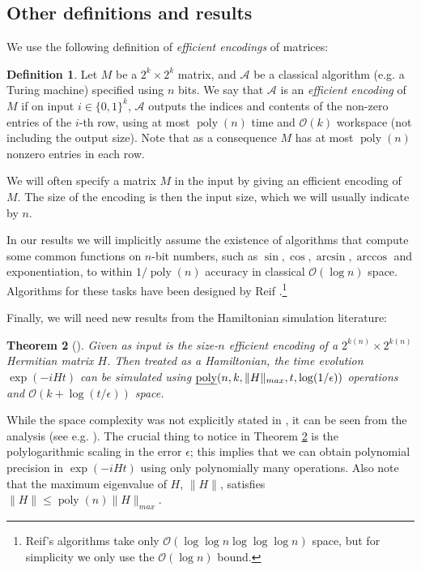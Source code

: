 \documentclass[11pt]{article}
\newtheorem{theorem}{Theorem}
\theoremstyle{definition}
\newtheorem{definition}[theorem]{Definition}
\theoremstyle{remark}
\newcommand\bigoh{\mathcal{O}}
\DeclareMathOperator{\poly}{poly}
\begin{document}
\subsection{Other definitions and results}
We use the following definition of \emph{efficient encodings} of matrices:
\begin{definition}\label{def: efficient encoding}Let $M$ be a $2^{k} \times 2^{k}$ matrix, and $\mathcal{A}$ be a classical algorithm (e.g. a Turing machine) specified using $n$ bits. We say that $\mathcal{A}$ is an \emph{efficient encoding} of $M$ if on input $i\in\{0,1\}^k$, $\mathcal{A}$ outputs the indices and contents of the non-zero entries of the $i$-th row, using at most $\poly(n)$ time and $\bigoh(k)$ workspace (not including the output size). Note that as a consequence $M$ has at most $\poly(n)$ nonzero entries in each row.
\end{definition}
We will often specify a matrix $M$ in the input by giving an efficient encoding of $M$. The size of the encoding is then the input size, which we will usually indicate by $n$.

In our results we will implicitly assume the existence of algorithms that compute some common functions on $n$-bit numbers, such as $\sin,\cos,\arcsin,\arccos$ and exponentiation, to within $1/\poly(n)$ accuracy in classical $\bigoh (\log{n})$ space.  Algorithms for these tasks have been designed by Reif \cite{reif}.\footnote{Reif's algorithms take only $\bigoh (\log\log{n}\log\log\log{n})$ space, but for simplicity we only use the $\bigoh (\log{n})$ bound.}

Finally, we will need new results from the Hamiltonian simulation literature:
\begin{theorem}[\cite{berry14,bccks15,berry15}] \label{thm:ham_sim}
Given as input is the size-$n$ efficient encoding of a $2^{k(n)} \times 2^{k(n)}$ Hermitian matrix $H$. Then treated as a Hamiltonian, the time evolution $\exp(-iHt)$ can be simulated using $\text{\emph{poly}}(n,k,\|H\|_{max}, t, \log(1/\epsilon))$ operations and $\bigoh(k+\log(t/\epsilon))$ space.
\end{theorem}
While the space complexity was not explicitly stated in \cite{berry14,bccks15,berry15}, it can be seen from the analysis (see e.g. \cite{bccks15}). The crucial thing to notice in Theorem \ref{thm:ham_sim} is the polylogarithmic scaling in the error $\epsilon$; this implies that we can obtain polynomial precision in $\exp(-iHt)$ using only polynomially many operations. Also note that the maximum eigenvalue of $H$, $\|H\|$, satisfies $\|H\| \le \poly(n) \|H\|_{max}$.
\end{document}
